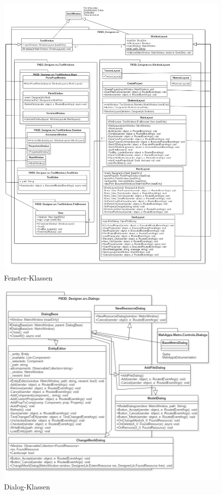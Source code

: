 \begin{figure}
	\begin{center}
		\includegraphics[width=1.2\textwidth]{03unserprogramm/Designer/Layouts.png}
		\caption{Fenster-Klassen}\label{windowclass}
	\end{center}
\end{figure}

\begin{figure}
	\begin{center}
		\includegraphics[width=\textwidth]{03unserprogramm/Designer/Dialogs.png}
		\caption{Dialog-Klassen}\label{dialogclass}
	\end{center}
\end{figure}

